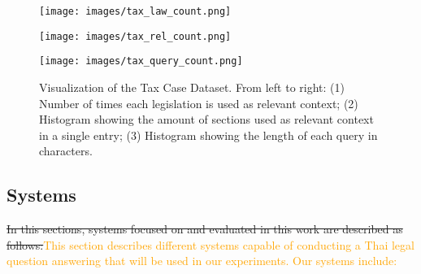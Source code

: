 \begin{figure}[H]
    \centering
    \begin{minipage}{0.34\textwidth}
        \centering
        \texttt{[image: images/tax\_law\_count.png]}
    \end{minipage}%
    \hfill
    \begin{minipage}{0.31\textwidth}
        \centering
        \texttt{[image: images/tax\_rel\_count.png]}
    \end{minipage}%
    \hfill
    \begin{minipage}{0.31\textwidth}
        \centering
        \texttt{[image: images/tax\_query\_count.png]}
    \end{minipage}

    \caption{Visualization of the Tax Case Dataset. From left to right: (1) Number of times each legislation is used as relevant context; (2) Histogram showing the amount of sections used as relevant context in a single entry; (3) Histogram showing the length of each query in characters.}
    \label{fig:tax_combined}
\end{figure}

\subsection{Systems}
\label{subsec:systems}
\st{In this sections, systems focused on and evaluated in this work are described as follows:}\textcolor{orange}{This section describes different systems capable of conducting a Thai legal question answering that will be used in our experiments. Our systems include:}

